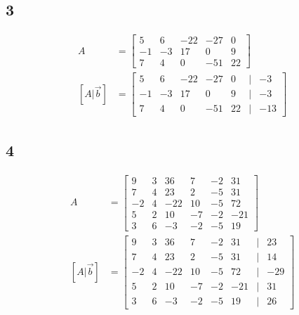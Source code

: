 \documentclass{article}
\begin{document}
\subsection{3}
\begin{align*}
	A & =
		\begin{bmatrix}
			5 & 6 & -22 & -27 & 0 \\
			-1 & -3 & 17 & 0 & 9 \\
			7 & 4 & 0 & -51 & 22
		\end{bmatrix} \\
	[A | \vec{b}] & =
		\begin{bmatrix}
			5 & 6 & -22 & -27 & 0 & | & -3 \\
			-1 & -3 & 17 & 0 & 9 & | & -3 \\
			7 & 4 & 0 & -51 & 22 & | & -13
		\end{bmatrix}
\end{align*}

\subsection{4}
\begin{align*}
	A & =
		\begin{bmatrix}
			9 & 3 & 36 & 7 & -2 & 31 \\
			7 & 4 & 23 & 2 & -5 & 31 \\
			-2 & 4 & -22 & 10 & -5 & 72 \\
			5 & 2 & 10 & -7 & -2 & -21 \\
			3 & 6 & -3 & -2 & -5 & 19
		\end{bmatrix} \\
	[A | \vec{b}] & =
		\begin{bmatrix}
			9 & 3 & 36 & 7 & -2 & 31 & | & 23 \\
			7 & 4 & 23 & 2 & -5 & 31 & | & 14 \\
			-2 & 4 & -22 & 10 & -5 & 72 & | & -29 \\
			5 & 2 & 10 & -7 & -2 & -21 & | & 31 \\
			3 & 6 & -3 & -2 & -5 & 19 & | & 26
		\end{bmatrix}
\end{align*}
\end{document}

